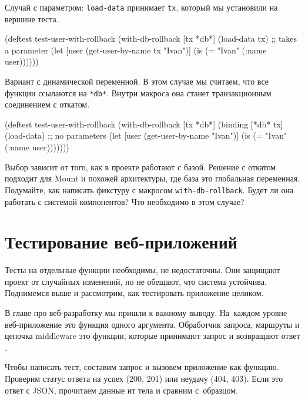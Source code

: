 Случай с параметром: \verb|load-data| принимает \verb|tx|, который мы
установили на вершине теста.

\begin{english}
  \begin{clojure}
(deftest test-user-with-rollback
  (with-db-rollback [tx *db*]
    (load-data tx) ;; takes a parameter
    (let [user (get-user-by-name tx "Ivan")]
      (is (= "Ivan" (:name user))))))
  \end{clojure}
\end{english}


Вариант с динамической переменной. В этом случае мы считаем, что все функции
ссылаются на \verb|*db*|. Внутри макроса она станет транзакционным соединением
с откатом.

\begin{english}
  \begin{clojure}
(deftest test-user-with-rollback
  (with-db-rollback [tx *db*]
    (binding [*db* tx]
      (load-data) ;; no parameters
      (let [user (get-user-by-name "Ivan")]
        (is (= "Ivan" (:name user)))))))
  \end{clojure}
\end{english}

Выбор зависит от того, как в проекте работают с базой. Решение с откатом
подходит для Mount и похожей архитектуры, где база это глобальная
переменная. Подумайте, как написать фикстуру с макросом
\verb|with-db-rollback|. Будет ли она работать с системой компонентов? Что
необходимо в этом случае?

\section{Тестирование веб-приложений}


Тесты на отдельные функции необходимы, не недостаточны. Они защищают проект от
случайных изменений, но не обещают, что система устойчива. Поднимемся выше и
рассмотрим, как тестировать приложение целиком.

В главе про веб-разработку мы пришли к важному выводу. На~каждом уровне
веб-приложение это функция одного аргумента. Обработчик запроса, маршруты и
цепочка middleware это функции, которые принимают запрос и возвращают
ответ .

Чтобы написать тест, составим запрос и вызовем приложение как функцию. Проверим
статус ответа на успех (200, 201) или неудачу (404, 403). Если это ответ с JSON,
прочитаем данные ит тела и сравним с~образцом.

